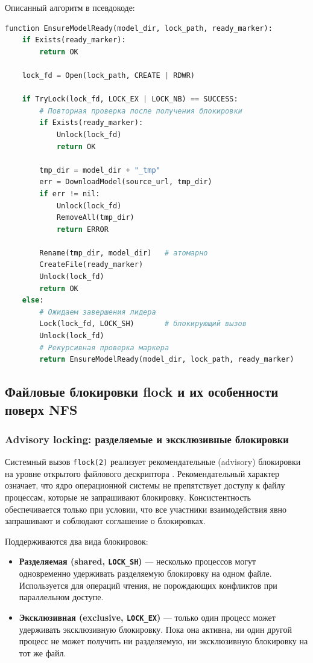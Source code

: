 Описанный алгоритм в псевдокоде:

\begin{lstlisting}[language=Python, caption={Псевдокод координированной загрузки модели}]
function EnsureModelReady(model_dir, lock_path, ready_marker):
    if Exists(ready_marker):
        return OK

    lock_fd = Open(lock_path, CREATE | RDWR)

    if TryLock(lock_fd, LOCK_EX | LOCK_NB) == SUCCESS:
        # Повторная проверка после получения блокировки
        if Exists(ready_marker):
            Unlock(lock_fd)
            return OK

        tmp_dir = model_dir + "_tmp"
        err = DownloadModel(source_url, tmp_dir)
        if err != nil:
            Unlock(lock_fd)
            RemoveAll(tmp_dir)
            return ERROR

        Rename(tmp_dir, model_dir)   # атомарно
        CreateFile(ready_marker)
        Unlock(lock_fd)
        return OK
    else:
        # Ожидаем завершения лидера
        Lock(lock_fd, LOCK_SH)       # блокирующий вызов
        Unlock(lock_fd)
        # Рекурсивная проверка маркера
        return EnsureModelReady(model_dir, lock_path, ready_marker)
\end{lstlisting}

\subsection{Файловые блокировки flock и их особенности поверх NFS}

\subsubsection{Advisory locking: разделяемые и эксклюзивные блокировки}

Системный вызов \texttt{flock(2)} реализует рекомендательные (advisory) блокировки на уровне открытого файлового дескриптора \cite{flock_man}. Рекомендательный характер означает, что ядро операционной системы не препятствует доступу к файлу процессам, которые не запрашивают блокировку. Консистентность обеспечивается только при условии, что все участники взаимодействия явно запрашивают и соблюдают соглашение о блокировках.

Поддерживаются два вида блокировок:
\begin{itemize}[leftmargin=*]
  \item \textbf{Разделяемая (shared, \texttt{LOCK\_SH})} --- несколько процессов могут одновременно удерживать разделяемую блокировку на одном файле. Используется для операций чтения, не порождающих конфликтов при параллельном доступе.
  \item \textbf{Эксклюзивная (exclusive, \texttt{LOCK\_EX})} --- только один процесс может удерживать эксклюзивную блокировку. Пока она активна, ни один другой процесс не может получить ни разделяемую, ни эксклюзивную блокировку на тот же файл.
\end{itemize}

